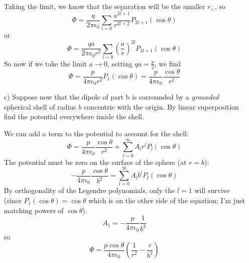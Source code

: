 \documentclass[a4paper,twoside]{article}
\begin{document}
\begin{itemize}
\begin{tcolorbox}[breakable]
        Taking the limit, we know that the separation will be the smaller $r_<$, so
        \begin{equation}
            \Phi = \frac{q}{2\pi\epsilon_0}\sum_{l=0}\frac{a^{2l+1}}{r^{2l+2}}P_{2l+1}(\cos\theta)
        \end{equation}
        or
        \begin{equation}
            \Phi = \frac{qa}{2\pi\epsilon_0 r^2}\sum_{l=0}\left( \frac{a}{r} \right)^{2l}P_{2l+1}(\cos\theta) 
        \end{equation}
        So now if we take the limit $a\to 0$, setting $qa = \frac{p}{2}$, we find
        \begin{equation}
            \Phi = \frac{p}{4\pi\epsilon_0 r^2}P_1(\cos\theta) = \frac{p}{4\pi\epsilon_0}\frac{\cos\theta}{r^2}
        \end{equation}
    \end{tcolorbox}

    \item[c)] Suppose now that the dipole of part b is surrounded by a \textit{grounded} spherical shell of radius $b$ concentric with the origin. By linear superposition find the potential everywhere inside the shell.
        \begin{tcolorbox}[breakable]
            We can add a term to the potential to account for the shell:
            \begin{equation}
                \Phi = \frac{p}{4\pi\epsilon_0}\frac{\cos\theta}{r^2} + \sum_{l=0}^{\infty}A_l r^l P_l(\cos\theta) 
            \end{equation}
            The potential must be zero on the surface of the sphere (at $r=b$):
            \begin{equation}
                -\frac{p}{4\pi\epsilon_0}\frac{\cos\theta}{b^2} = \sum_{l=0}^{\infty} A_l b^l P_l(\cos\theta)
            \end{equation}
            By orthogonality of the Legendre polynomials, only the $l=1$ will survive (since $P_1(\cos\theta) = \cos\theta$ which is on the other side of the equation; I'm just matching powers of $\cos\theta$).
            \begin{equation}
                A_1 = -\frac{p}{4\pi\epsilon_0}\frac{1}{b^3}
            \end{equation}
            so
            \begin{equation}
                \Phi = \frac{p\cos\theta}{4\pi\epsilon_0}\left( \frac{1}{r^2} - \frac{r}{b^3} \right) 
            \end{equation}
        \end{tcolorbox}

\end{itemize}
\end{document}
